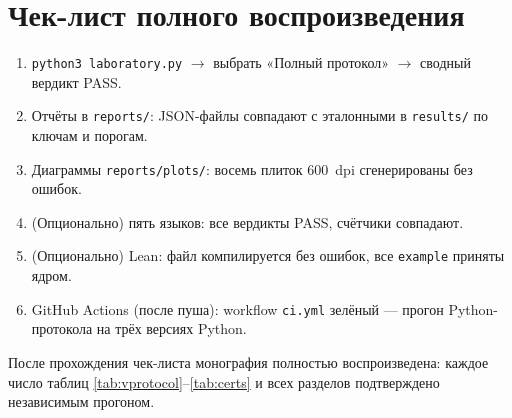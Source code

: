 \section{Чек-лист полного воспроизведения}\label{sec:checklist}

\begin{enumerate}[leftmargin=2em, itemsep=0.15em]
\item \texttt{python3 laboratory.py} $\to$ выбрать «Полный
  протокол» $\to$ сводный вердикт PASS.
\item Отчёты в \texttt{reports/}: JSON-файлы совпадают с
  эталонными в \texttt{results/} по ключам и порогам.
\item Диаграммы \texttt{reports/plots/}: восемь плиток $600$~dpi
  сгенерированы без ошибок.
\item (Опционально) пять языков: все вердикты PASS, счётчики
  совпадают.
\item (Опционально) Lean: файл компилируется без ошибок,
  все \texttt{example} приняты ядром.
\item GitHub Actions (после пуша): workflow \texttt{ci.yml} зелёный
  --- прогон Python-протокола на трёх версиях Python.
\end{enumerate}

После прохождения чек-листа монография полностью воспроизведена:
каждое число таблиц \ref{tab:vprotocol}--\ref{tab:certs} и всех
разделов подтверждено независимым прогоном.
